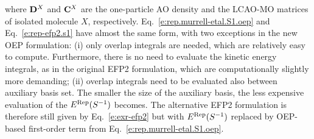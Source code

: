 \documentclass[aip,jcp,amsmath,amssymb,preprint,floatfix]{revtex4-1}
\begin{document}
%
where ${\bf D}^X$ and ${\bf C}^X$ are the one\hyp{}particle AO density and
the LCAO\hyp{}MO matrices of isolated molecule $X$, respectively.
%
Eq.~\eqref{e:rep.murrell-etal.S1.oep} and Eq.~\eqref{e:rep-efp2.s1} have almost
the same form, with two exceptions in the new OEP formulation: 
(i) only overlap integrals are needed, which are relatively easy to
compute. Furthermore, there is no need to evaluate the kinetic
energy integrals, as in the original EFP2
formulation, which are computationally slightly more demanding;
(ii) overlap integrals need to be evaluated also between
auxiliary basis set. The smaller the size of the auxiliary basis, the less expensive
evaluation of the $E^{\rm Rep}(S^{-1})$ becomes. 
The alternative EFP2 formulation %
is therefore still given by Eq.~\eqref{e:exr-efp2}
%
%
but with $E^{\rm Rep}(S^{-1})$ replaced by OEP\hyp{}based
first\hyp{}order term from Eq.~\eqref{e:rep.murrell-etal.S1.oep}.
\end{document}
